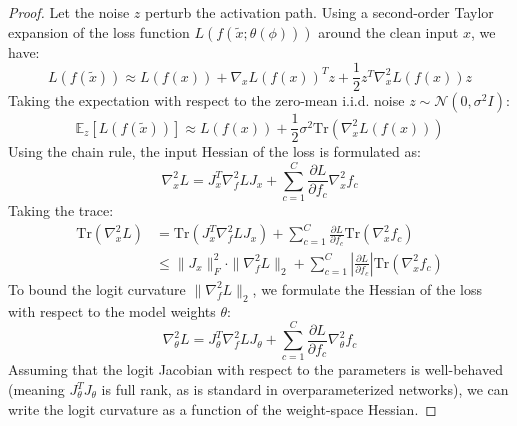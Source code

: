 \documentclass{article}
\theoremstyle{plain}
\theoremstyle{definition}
\theoremstyle{remark}
\begin{document}
\begin{proof}
Let the noise $z$ perturb the activation path. Using a second-order Taylor expansion of the loss function $L(f(\tilde{x}; \theta(\phi)))$ around the clean input $x$, we have:
\begin{equation}
    L(f(\tilde{x})) \approx L(f(x)) + \nabla_x L(f(x))^T z + \frac{1}{2} z^T \nabla_x^2 L(f(x)) z
\end{equation}
Taking the expectation with respect to the zero-mean i.i.d. noise $z \sim \mathcal{N}(0, \sigma^2 I)$:
\begin{equation}
    \mathbb{E}_z [L(f(\tilde{x}))] \approx L(f(x)) + \frac{1}{2} \sigma^2 \text{Tr}\left(\nabla_x^2 L(f(x))\right)
\end{equation}
Using the chain rule, the input Hessian of the loss is formulated as:
\begin{equation}
    \nabla_x^2 L = J_x^T \nabla_f^2 L J_x + \sum_{c=1}^C \frac{\partial L}{\partial f_c} \nabla_x^2 f_c
\end{equation}
Taking the trace:
\begin{align}
    \text{Tr}(\nabla_x^2 L) &= \text{Tr}(J_x^T \nabla_f^2 L J_x) + \sum_{c=1}^C \frac{\partial L}{\partial f_c} \text{Tr}(\nabla_x^2 f_c) \nonumber \\
    &\le \|J_x\|_F^2 \cdot \|\nabla_f^2 L\|_2 + \sum_{c=1}^C \left| \frac{\partial L}{\partial f_c} \right| \text{Tr}(\nabla_x^2 f_c)
\end{align}
To bound the logit curvature $\|\nabla_f^2 L\|_2$, we formulate the Hessian of the loss with respect to the model weights $\theta$:
\begin{equation}
    \nabla_\theta^2 L = J_\theta^T \nabla_f^2 L J_\theta + \sum_{c=1}^C \frac{\partial L}{\partial f_c} \nabla_\theta^2 f_c
\end{equation}
Assuming that the logit Jacobian with respect to the parameters is well-behaved (meaning $J_\theta^T J_\theta$ is full rank, as is standard in overparameterized networks), we can write the logit curvature as a function of the weight-space Hessian.


\end{proof}
\end{document}
